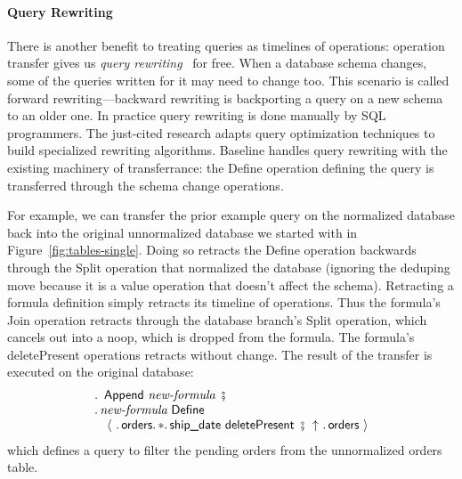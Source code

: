 \documentclass[english,submission]{programming}
\theoremstyle{definition}
\DeclareMathOperator{\exec}{\ \fatsemi\ \ }
\begin{document}





\paragraph{Query Rewriting}

There is another benefit to treating queries as timelines of operations: operation transfer gives us \textit{query rewriting}~\cite{curino08, herrmann17} for free. When a database schema changes, some of the queries written for it may need to change too. This scenario is called forward rewriting---backward rewriting is backporting a query on a new schema to an older one.
In practice query rewriting is done manually by SQL programmers. The just-cited research adapts query optimization techniques to build specialized rewriting algorithms.
Baseline handles query rewriting with the existing machinery of transferrance: the \textsf{Define} operation defining the query is transferred through the schema change operations.

For example, we can transfer the prior example query on the normalized database back into the original unnormalized database we started with in Figure~\ref{fig:tables-single}. Doing so retracts the \textsf{Define} operation backwards through the \textsf{Split} operation that normalized the database (ignoring the deduping \textsf{move} because it is a value operation that doesn't affect the schema). Retracting a formula definition simply retracts its timeline of operations. Thus the formula's \textsf{Join} operation retracts through the database branch's \textsf{Split} operation, which cancels out into a \textsf{noop}, which is dropped from the formula. The formula's \textsf{deletePresent} operations retracts without change. The result of the transfer is executed on the original database:
\[
\begin{array}{l}
  \ldotp \textsf{ Append } \textit{new-formula} \exec\\
  \ldotp \textit{new-formula} \textsf{ Define } \\
  \quad \langle
\ \ldotp \textsf{orders}\ldotp * \ldotp \textsf{ship\_date deletePresent} \exec
\!\!\uparrow \ \ldotp \textsf{orders}\
  \rangle\\
\end{array}
\]
which defines a query to filter the pending orders from the unnormalized orders table.
\end{document}
